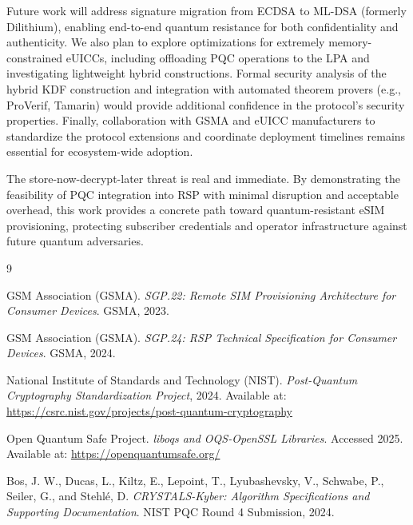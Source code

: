 \documentclass{easychair}
\begin{document}
Future work will address signature migration from ECDSA to ML-DSA (formerly Dilithium), enabling end-to-end quantum resistance for both confidentiality and authenticity. We also plan to explore optimizations for extremely memory-constrained eUICCs, including offloading PQC operations to the LPA and investigating lightweight hybrid constructions. Formal security analysis of the hybrid KDF construction and integration with automated theorem provers (e.g., ProVerif, Tamarin) would provide additional confidence in the protocol's security properties. Finally, collaboration with GSMA and eUICC manufacturers to standardize the protocol extensions and coordinate deployment timelines remains essential for ecosystem-wide adoption.

The store-now-decrypt-later threat is real and immediate. By demonstrating the feasibility of PQC integration into RSP with minimal disruption and acceptable overhead, this work provides a concrete path toward quantum-resistant eSIM provisioning, protecting subscriber credentials and operator infrastructure against future quantum adversaries.


\begin{thebibliography}{9}

GSM Association (GSMA). 
\emph{SGP.22: Remote SIM Provisioning Architecture for Consumer Devices}. 
GSMA, 2023.

GSM Association (GSMA). 
\emph{SGP.24: RSP Technical Specification for Consumer Devices}. 
GSMA, 2024.

National Institute of Standards and Technology (NIST). 
\emph{Post-Quantum Cryptography Standardization Project}, 2024. 
Available at: \url{https://csrc.nist.gov/projects/post-quantum-cryptography}

Open Quantum Safe Project. 
\emph{liboqs and OQS-OpenSSL Libraries}. 
Accessed 2025. 
Available at: \url{https://openquantumsafe.org/}

Bos, J. W., Ducas, L., Kiltz, E., Lepoint, T., Lyubashevsky, V., Schwabe, P., Seiler, G., and Stehlé, D. 
\emph{CRYSTALS-Kyber: Algorithm Specifications and Supporting Documentation}. 
NIST PQC Round 4 Submission, 2024.

\end{thebibliography}
\end{document}
